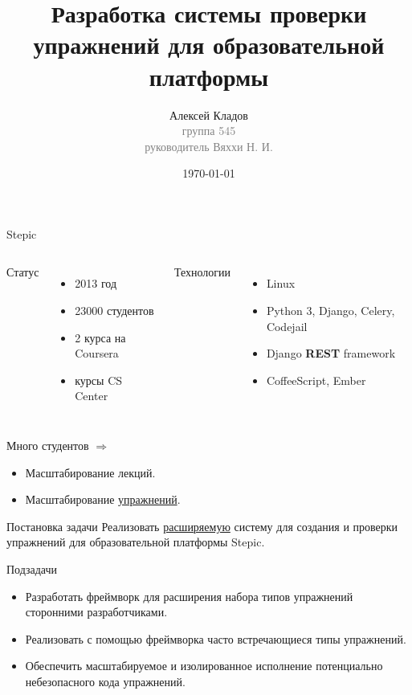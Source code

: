 \documentclass{beamer}
\title[Упражнения в Stepic]{Разработка системы проверки упражнений для
  образовательной платформы}
\author{Алексей Кладов\\
  { \footnotesize \textcolor{gray}{группа 545\\ руководитель Вяххи Н. И.}}}
\institute[СПбГУ]{Санкт-Петербургский государственный университет}
\date{\today} %
\begin{document}
\begin{frame}
\titlepage %
\end{frame}

\begin{frame}{Stepic}
  \begin{columns}[t]
    Статус
    \begin{itemize}
    \item 2013 год
    \item 23000 студентов
    \item 2 курса на Coursera
    \item курсы CS Center
    \end{itemize}

    Технологии
    \begin{itemize}
    \item Linux
    \item Python 3, Django, Celery, Codejail
    \item Django \textbf{REST} framework
    \item CoffeeScript, Ember
    \end{itemize}
  \end{columns}

  \medskip

  Много студентов $\Rightarrow$
  \begin{itemize}
  \item Масштабирование лекций.
  \item Масштабирование \underline{упражнений}.
  \end{itemize}
\end{frame}

\begin{frame}{Постановка задачи}
  Реализовать \underline{расширяемую} систему для создания и проверки упражнений
  для образовательной платформы Stepic.

  \medskip

  Подзадачи
  \begin{itemize}
  \item Разработать фреймворк для расширения набора типов упражнений
    сторонними разработчиками.
  \item Реализовать с помощью фреймворка часто встречающиеся типы упражнений.
  \item Обеспечить масштабируемое и изолированное исполнение
    потенциально небезопасного кода упражнений.
  \end{itemize}
\end{frame}
\end{document}
